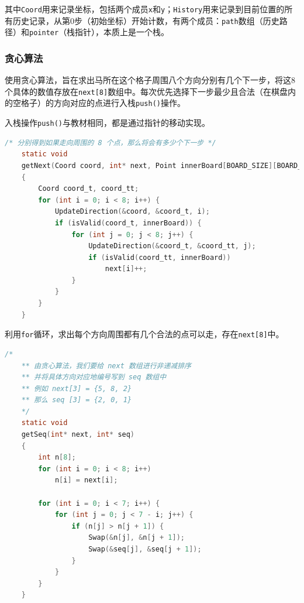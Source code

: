 \noindent
其中{\tt Coord}用来记录坐标，包括两个成员{\tt x}和{\tt y}；{\tt History}用来记录到目前位置的所有历史记录，从第$0$步（初始坐标）开始计数，有两个成员：{\tt path}数组（历史路径）和{\tt pointer}（栈指针），本质上是一个栈。

\vspace{1ex}

\subsubsection{贪心算法}

\noindent
使用贪心算法，旨在求出马所在这个格子周围八个方向分别有几个下一步，将这$8$个具体的数值存放在{\tt next[8]}数组中。每次优先选择下一步最少且合法（在棋盘内的空格子）的方向对应的点进行入栈{\tt push()}操作。

\vspace{1ex}

\noindent
入栈操作{\tt push()}与教材相同，都是通过指针的移动实现。


\begin{lstlisting}[language=C, caption={实现{\tt getnext()}操作}]
    /* 分别得到如果走向周围的 8 个点，那么将会有多少个下一步 */
    static void
    getNext(Coord coord, int* next, Point innerBoard[BOARD_SIZE][BOARD_SIZE])
    {
        Coord coord_t, coord_tt;
        for (int i = 0; i < 8; i++) {
            UpdateDirection(&coord, &coord_t, i);
            if (isValid(coord_t, innerBoard)) {
                for (int j = 0; j < 8; j++) {
                    UpdateDirection(&coord_t, &coord_tt, j);
                    if (isValid(coord_tt, innerBoard))
                        next[i]++;
                }
            }
        }
    }
\end{lstlisting}

\vspace{1ex}

\noindent
利用{\tt for}循环，求出每个方向周围都有几个合法的点可以走，存在{\tt next[8]}中。


\begin{lstlisting}[language=C, caption={对{\tt next}中值实现从小到大的排序操作}]
    /*
    ** 由贪心算法，我们要给 next 数组进行非递减排序
    ** 并将具体方向对应地编号写到 seq 数组中
    ** 例如 next[3] = {5, 8, 2}
    ** 那么 seq [3] = {2, 0, 1}
    */
    static void
    getSeq(int* next, int* seq)
    {
        int n[8];
        for (int i = 0; i < 8; i++)
            n[i] = next[i];

        for (int i = 0; i < 7; i++) {
            for (int j = 0; j < 7 - i; j++) {
                if (n[j] > n[j + 1]) {
                    Swap(&n[j], &n[j + 1]);
                    Swap(&seq[j], &seq[j + 1]);
                }
            }
        }
    }
\end{lstlisting}

